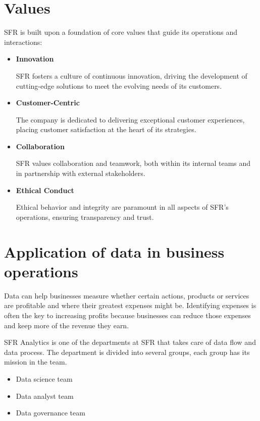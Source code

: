 \section{Values}

SFR is built upon a foundation of core values that guide its operations and interactions:


\begin{itemize}

    \item \textbf{Innovation}
    
    SFR fosters a culture of continuous innovation, driving the development of cutting-edge solutions to meet the evolving needs of its customers.
    
    \item \textbf{Customer-Centric}
    
    The company is dedicated to delivering exceptional customer experiences, placing customer satisfaction at the heart of its strategies.
    
    \item \textbf{Collaboration}
    
    SFR values collaboration and teamwork, both within its internal teams and in partnership with external stakeholders.
    
    \item \textbf{Ethical Conduct}
    
    Ethical behavior and integrity are paramount in all aspects of SFR's operations, ensuring transparency and trust.
    
\end{itemize}

\section{Application of data in business operations}

Data can help businesses measure whether certain actions, products or services are profitable and where their greatest expenses might be. Identifying expenses is often the key to increasing profits because businesses can reduce those expenses and keep more of the revenue they earn.

SFR Analytics is one of the departments at SFR that takes care of data flow and data process. The department is divided into several groups, each group has its mission in the team.

\begin{itemize}
    \item Data science team
    \item Data analyst team
    \item Data governance team
\end{itemize}

